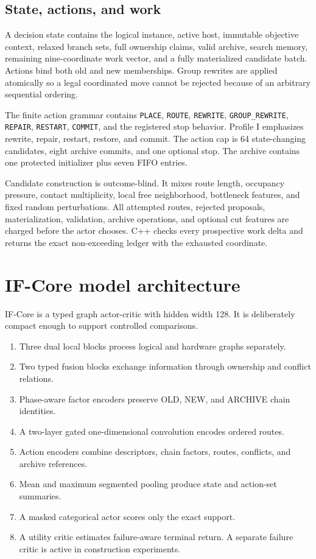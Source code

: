 \documentclass[
  american,
  10pt,
  a4paper,
]{article}
\providecommand{\tightlist}{%
  \setlength{\itemsep}{0pt}\setlength{\parskip}{0pt}}
\begin{document}
\subsection{State, actions, and work}\label{state-actions-and-work}

A decision state contains the logical instance, active host, immutable
objective context, relaxed branch sets, full ownership claims, valid
archive, search memory, remaining nine-coordinate work vector, and a
fully materialized candidate batch. Actions bind both old and new
memberships. Group rewrites are applied atomically so a legal
coordinated move cannot be rejected because of an arbitrary sequential
ordering.

The finite action grammar contains \texttt{PLACE}, \texttt{ROUTE},
\texttt{REWRITE}, \texttt{GROUP\_REWRITE}, \texttt{REPAIR},
\texttt{RESTART}, \texttt{COMMIT}, and the registered stop behavior.
Profile I emphasizes rewrite, repair, restart, restore, and commit. The
action cap is 64 state-changing candidates, eight archive commits, and
one optional stop. The archive contains one protected initializer plus
seven FIFO entries.

Candidate construction is outcome-blind. It mixes route length,
occupancy pressure, contact multiplicity, local free neighborhood,
bottleneck features, and fixed random perturbations. All attempted
routes, rejected proposals, materialization, validation, archive
operations, and optional cut features are charged before the actor
chooses. C++ checks every prospective work delta and returns the exact
non-exceeding ledger with the exhausted coordinate.

\section{IF-Core model architecture}\label{if-core-model-architecture}

IF-Core is a typed graph actor-critic with hidden width 128. It is
deliberately compact enough to support controlled comparisons.

\begin{enumerate}
\def\labelenumi{\arabic{enumi}.}
\tightlist
\item
  Three dual local blocks process logical and hardware graphs
  separately.
\item
  Two typed fusion blocks exchange information through ownership and
  conflict relations.
\item
  Phase-aware factor encoders preserve OLD, NEW, and ARCHIVE chain
  identities.
\item
  A two-layer gated one-dimensional convolution encodes ordered routes.
\item
  Action encoders combine descriptors, chain factors, routes, conflicts,
  and archive references.
\item
  Mean and maximum segmented pooling produce state and action-set
  summaries.
\item
  A masked categorical actor scores only the exact support.
\item
  A utility critic estimates failure-aware terminal return. A separate
  failure critic is active in construction experiments.
\end{enumerate}
\end{document}
